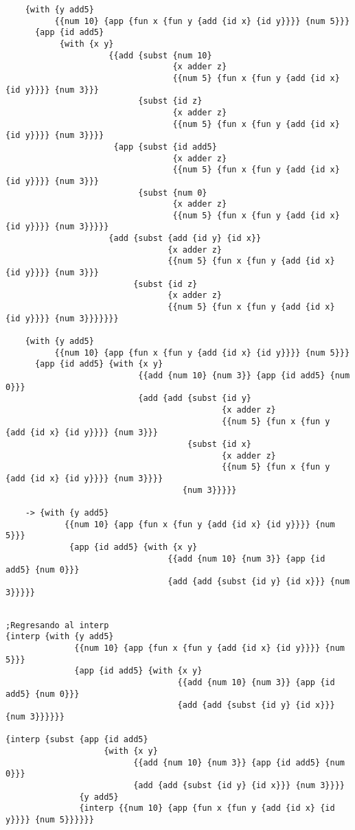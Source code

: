 \documentclass[a4paper]{article}
\begin{document}
\begin{verbatim}
	{with {y add5}
	      {{num 10} {app {fun x {fun y {add {id x} {id y}}}} {num 5}}}
   	  {app {id add5}
       	   {with {x y}
	                 {{add {subst {num 10}
    	                          {x adder z}
        	                      {{num 5} {fun x {fun y {add {id x} {id y}}}} {num 3}}}
            	           {subst {id z}
                	              {x adder z}
                    	          {{num 5} {fun x {fun y {add {id x} {id y}}}} {num 3}}}}
	                  {app {subst {id add5}
    	                          {x adder z}
        	                      {{num 5} {fun x {fun y {add {id x} {id y}}}} {num 3}}}
            	           {subst {num 0}
                	              {x adder z}
                    	          {{num 5} {fun x {fun y {add {id x} {id y}}}} {num 3}}}}}
	                 {add {subst {add {id y} {id x}}
    	                         {x adder z}
        	                     {{num 5} {fun x {fun y {add {id x} {id y}}}} {num 3}}}
            	          {subst {id z}
                	             {x adder z}
                    	         {{num 5} {fun x {fun y {add {id x} {id y}}}} {num 3}}}}}}}

	{with {y add5}
	      {{num 10} {app {fun x {fun y {add {id x} {id y}}}} {num 5}}}
   	  {app {id add5} {with {x y}
       	                   {{add {num 10} {num 3}} {app {id add5} {num 0}}}
           	               {add {add {subst {id y}
               	                            {x adder z}
                   	                        {{num 5} {fun x {fun y {add {id x} {id y}}}} {num 3}}}
                       	             {subst {id x}
                           	                {x adder z}
                               	            {{num 5} {fun x {fun y {add {id x} {id y}}}} {num 3}}}}
	                                {num 3}}}}}
	
	-> {with {y add5}
    	    {{num 10} {app {fun x {fun y {add {id x} {id y}}}} {num 5}}}
	         {app {id add5} {with {x y}
    	                         {{add {num 10} {num 3}} {app {id add5} {num 0}}}
        	                     {add {add {subst {id y} {id x}}} {num 3}}}}}

\end{verbatim}
\color{black}
\begin{verbatim}

;Regresando al interp
{interp {with {y add5}
              {{num 10} {app {fun x {fun y {add {id x} {id y}}}} {num 5}}}
              {app {id add5} {with {x y}
                                   {{add {num 10} {num 3}} {app {id add5} {num 0}}}
                                   {add {add {subst {id y} {id x}}} {num 3}}}}}}

{interp {subst {app {id add5}
                    {with {x y}
                          {{add {num 10} {num 3}} {app {id add5} {num 0}}}
                          {add {add {subst {id y} {id x}}} {num 3}}}}
               {y add5}
               {interp {{num 10} {app {fun x {fun y {add {id x} {id y}}}} {num 5}}}}}}

\end{verbatim}
\end{document}
